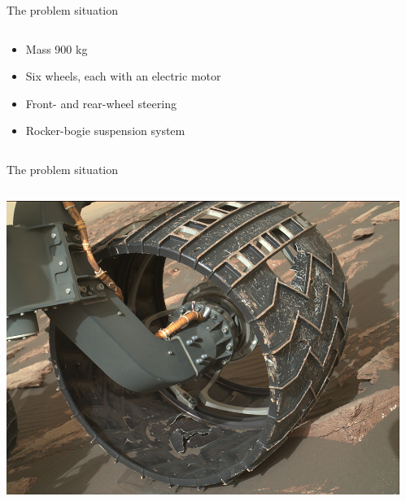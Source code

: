 \documentclass[presentation,aspectratio=169, usenames, dvipsnames]{beamer}
\begin{document}
\begin{frame}[label={sec:orga9b24dc}]{The problem situation}
\begin{columns}
\begin{column}{0.6\columnwidth}
\begin{itemize}
\item Mass 900 kg
\item Six wheels, each with an electric motor
\item Front- and rear-wheel steering
\item Rocker-bogie suspension system
\end{itemize}
\end{column}
\end{columns}
\end{frame}

\begin{frame}[label={sec:org6f52b65}]{The problem situation}
\begin{columns}
\begin{column}{0.4\columnwidth}
\begin{center}
 \includegraphics[width=1.0\linewidth]{../../figures/curiosity-wheel.jpg}
\end{center}
\end{column}

\begin{column}{0.6\columnwidth}
\pause


\end{column}
\end{columns}
\end{frame}
\end{document}
